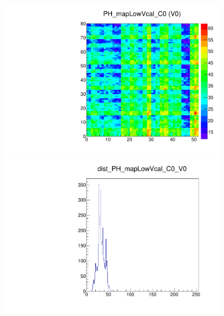 \begin{figure}[!Hp]
\centering
\begin{minipage}{0.45\textwidth}
  \includegraphics[width=1.0\textwidth]{figures/phopt_PH_mapLowVcal.pdf}
  \caption{}
  \label{fig:phopt_PH_mapLowVcal}
\end{minipage}
\hspace{0.3cm}
\begin{minipage}{0.45\textwidth}
  \includegraphics[width=1.0\textwidth]{figures/phopt_dist_PH_mapLowVcal.pdf}
  \caption{}
  \label{fig:phopt_dist_PH_mapLowVcal}
\end{minipage}
\end{figure}

